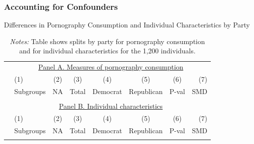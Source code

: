 \documentclass[12pt, letterpaper]{article}
\begin{document}
\subsubsection{Accounting for Confounders}
\begin{table}[ht] \centering \small \setlength\tabcolsep{5 pt}
	\caption{Differences in Pornography Consumption and Individual Characteristics by Party}
	\label{tab:characteristics_split_by_party}
	\begin{adjustbox}{max width=\textwidth}
		\begin{tabular}{@{\hspace{0\tabcolsep}}llrcccrr@{\hspace{0\tabcolsep}}}
			\toprule
			&\multicolumn{7}{c}{\underline{Panel A. Measures of pornography consumption}}\\
			&\multicolumn{1}{l}{(1)}&\multicolumn{1}{c}{(2)}&\multicolumn{1}{c}{(3)}&\multicolumn{1}{c}{(4)}&\multicolumn{1}{c}{(5)}&\multicolumn{1}{c}{(6)}&\multicolumn{1}{r}{(7)}\\			
			&\multicolumn{1}{l}{Subgroups}&\multicolumn{1}{c}{NA}&\multicolumn{1}{c}{Total}&\multicolumn{1}{c}{Democrat}&\multicolumn{1}{c}{Republican}&\multicolumn{1}{c}{P-val}&\multicolumn{1}{r}{SMD}\\
			\cmidrule{2-8}
			\\
			\cmidrule{2-8}
			&\multicolumn{7}{c}{\underline{Panel B. Individual characteristics}}\\
			&\multicolumn{1}{l}{(1)}&\multicolumn{1}{c}{(2)}&\multicolumn{1}{c}{(3)}&\multicolumn{1}{c}{(4)}&\multicolumn{1}{c}{(5)}&\multicolumn{1}{c}{(6)}&\multicolumn{1}{r}{(7)}\\			
			&\multicolumn{1}{l}{Subgroups}&\multicolumn{1}{c}{NA}&\multicolumn{1}{c}{Total}&\multicolumn{1}{c}{Democrat}&\multicolumn{1}{c}{Republican}&\multicolumn{1}{c}{P-val}&\multicolumn{1}{r}{SMD}\\
			\cmidrule{2-8}
			\\
			\bottomrule
		\end{tabular}
	\end{adjustbox}
	\caption*{\scriptsize \emph{Notes:}
		Table shows splits by party for pornography consumption and for individual characteristics for the 1,200 individuals.
}
\end{table}
\end{document}

